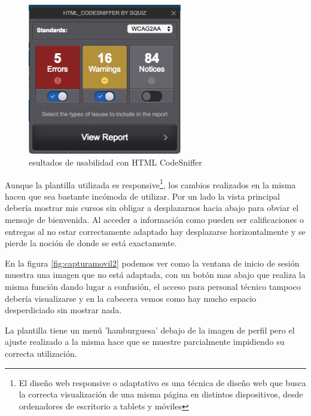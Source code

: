\begin{figure}[H]
\centering
\includegraphics[width=0.6\textwidth]{../screenshots/htmlcodesniffer}
\caption{esultados de usabilidad con HTML CodeSniffer}
\label{fig:htmlcodesniffer}
\end{figure}


\bigskip
Aunque la plantilla utilizada es responsive\footnote{El diseño web responsive o adaptativo es una técnica de diseño web que busca la correcta visualización de una misma página en distintos dispositivos, desde ordenadores de escritorio a tablets y móviles}, los cambios realizados en la misma hacen que sea bastante incómoda de utilizar. Por un lado la vista principal debería mostrar mis cursos sin obligar a desplazarnos hacia abajo para obviar el mensaje de bienvenida. Al acceder a información como pueden ser calificaciones o entregas al no estar correctamente adaptado hay desplazarse horizontalmente y se pierde la noción de donde se está exactamente.

\bigskip
En la figura \ref{fig:capturamovil2} podemos ver como la ventana de inicio de sesión muestra una imagen que no está adaptada, con un botón mas abajo que realiza la misma función dando lugar a confusión, el acceso para personal técnico tampoco debería visualizarse y en la cabecera vemos como hay mucho espacio desperdiciado sin mostrar nada.

\bigskip
La plantilla tiene un menú 'hamburguesa' debajo de la imagen de perfil pero el ajuste realizado a la misma hace que se muestre parcialmente impidiendo su correcta utilización.


